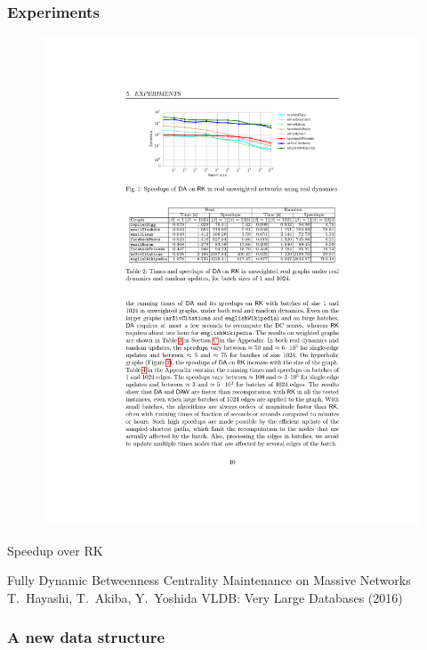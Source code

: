 \begin{frame}
  \frametitle{Experiments}
  \begin{figure}
    \includegraphics[width=\textwidth]{imgs/Bergamini-speedup.pdf}
  \end{figure}
  Speedup over RK
\end{frame}

\begin{frame}
  \centering
  \vfill
  {\huge Fully Dynamic Betweenness Centrality Maintenance on Massive
  Networks}
  \vfill
  {\Large T.~Hayashi, T.~Akiba, Y.~Yoshida}
  \vfill
  {\large VLDB: Very Large Databases (2016)}
  \vfill
\end{frame}

\begin{frame}
  \frametitle{A new data structure}
\end{frame}

